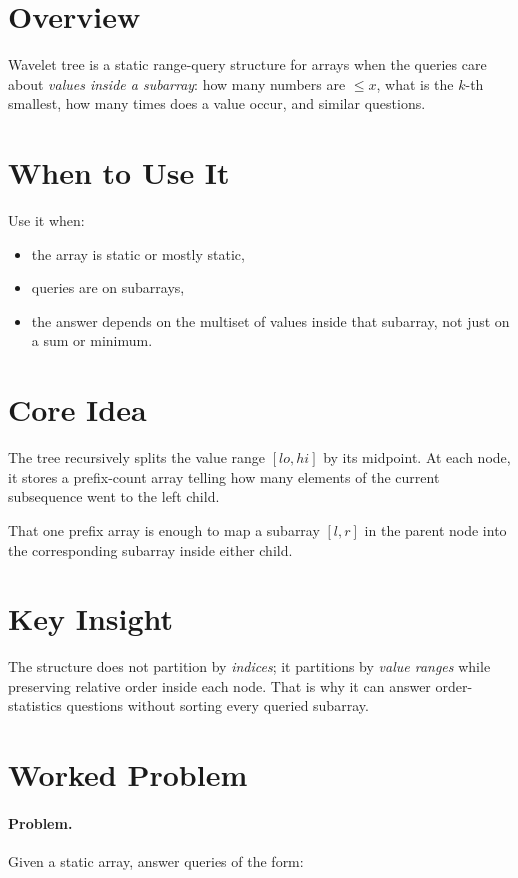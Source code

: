\section*{Overview}

Wavelet tree is a static range-query structure for arrays when the queries care about \emph{values inside a subarray}:
how many numbers are \(\le x\), what is the \(k\)-th smallest, how many times does a value occur, and similar
questions.

\section*{When to Use It}

Use it when:

\begin{itemize}
  \item the array is static or mostly static,
  \item queries are on subarrays,
  \item the answer depends on the multiset of values inside that subarray, not just on a sum or minimum.
\end{itemize}

\section*{Core Idea}

The tree recursively splits the value range \([lo, hi]\) by its midpoint. At each node, it stores a prefix-count array
telling how many elements of the current subsequence went to the left child.

That one prefix array is enough to map a subarray \([l, r]\) in the parent node into the corresponding subarray inside
either child.

\section*{Key Insight}

The structure does not partition by \emph{indices}; it partitions by \emph{value ranges} while preserving relative order
inside each node. That is why it can answer order-statistics questions without sorting every queried subarray.

\section*{Worked Problem}

\paragraph{Problem.}
Given a static array, answer queries of the form:

